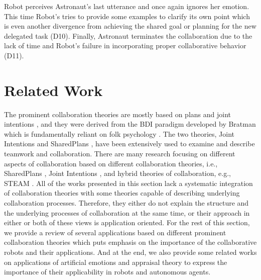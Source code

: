 Robot perceives Astronaut's last utterance and once again ignores her emotion.
This time Robot's tries to provide some examples to clarify its own point
which is even another divergence from achieving the shared goal or planning
for the new delegated task (D10). Finally, Astronaut terminates the
collaboration due to the lack of time and Robot's failure in incorporating
proper collaborative behavior (D11).\\

\noindent{}

\section{Related Work}
\label{sec:related-work}

The prominent collaboration theories are mostly based on plans and joint
intentions
\cite{cohen:teamwork,grosz:plans-discourse,Litman:discourse-commonsense}, and
they were derived from the BDI paradigm developed by Bratman
\cite{bratman:intentions-plans} which is fundamentally reliant on folk
psychology \cite{ravenscroft:folk}. The two theories, Joint Intentions
\cite{cohen:teamwork} and SharedPlans \cite{grosz:plans-discourse}, have been
extensively used to examine and describe teamwork and collaboration. There are
many research focusing on different aspects of collaboration based on different
collaboration theories, i.e., SharedPlans
\cite{grosz:planning-acting,grosz:collaboration,grosz:plans-discourse}, Joint
Intentions \cite{cohen:teamwork}, and hybrid theories of collaboration, e.g.,
STEAM \cite{tambe:flexible-teamwork}. All of the works presented in this section
lack a systematic integration of collaboration theories with some theories
capable of describing underlying collaboration processes. Therefore, they
either do not explain the structure and the underlying processes of
collaboration at the same time, or their approach in either or both
of these views is application oriented. For the rest of this section, we provide
a review of several applications based on different prominent collaboration
theories which puts emphasis on the importance of the collaborative robots and
their applications. And at the end, we also provide some related works on
applications of artificial emotions and appraisal theory to express the
importance of their applicability in robots and autonomous agents.


